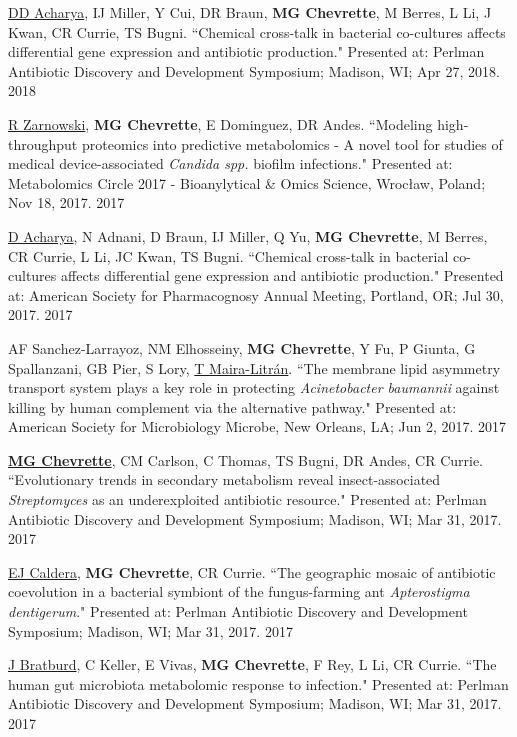 \begin{cvpubs}
\cvpub
{\underline{DD Acharya}, IJ Miller, Y Cui, DR Braun, \textbf{MG Chevrette}, M Berres, L Li, J Kwan, CR Currie, TS Bugni. ``Chemical cross-talk in bacterial co-cultures affects differential gene expression and antibiotic production." Presented at: Perlman Antibiotic Discovery and Development Symposium; Madison, WI; Apr 27, 2018.}
{2018}

\cvpub
{\underline{R Zarnowski}, \textbf{MG Chevrette}, E Dominguez, DR Andes. ``Modeling high-throughput proteomics into predictive metabolomics - A novel tool for studies of medical device-associated \textit{Candida spp.} biofilm infections." Presented at: Metabolomics Circle 2017 - Bioanylytical \& Omics Science, Wrocław, Poland; Nov 18, 2017.}
{2017}

\cvpub
{\underline{D Acharya}, N Adnani, D Braun, IJ Miller, Q Yu, \textbf{MG Chevrette}, M Berres, CR Currie, L Li, JC Kwan, TS Bugni. ``Chemical cross-talk in bacterial co-cultures affects differential gene expression and antibiotic production." Presented at: American Society for Pharmacognosy Annual Meeting, Portland, OR; Jul 30, 2017.}
{2017}

\cvpub
{AF Sanchez-Larrayoz, NM Elhosseiny, \textbf{MG Chevrette}, Y Fu, P Giunta, G Spallanzani, GB Pier, S Lory, \underline{T Maira-Litr\'{a}n}. ``The membrane lipid asymmetry transport system plays a key role in protecting \textit{Acinetobacter baumannii} against killing by human complement via the alternative pathway." Presented at: American Society for Microbiology Microbe, New Orleans, LA; Jun 2, 2017.}
{2017}

\cvpub
{\underline{\textbf{MG Chevrette}}, CM Carlson, C Thomas, TS Bugni, DR Andes, CR Currie. ``Evolutionary trends in secondary metabolism reveal insect-associated \textit{Streptomyces} as an underexploited antibiotic resource." Presented at: Perlman Antibiotic Discovery and Development Symposium; Madison, WI; Mar 31, 2017.}
{2017}

\cvpub
{\underline{EJ Caldera}, \textbf{MG Chevrette}, CR Currie. ``The geographic mosaic of antibiotic coevolution in a bacterial symbiont of the fungus-farming ant \textit{Apterostigma dentigerum}." Presented at: Perlman Antibiotic Discovery and Development Symposium; Madison, WI; Mar 31, 2017.}
{2017}

\cvpub
{\underline{J Bratburd}, C Keller, E Vivas, \textbf{MG Chevrette}, F Rey, L Li, CR Currie. ``The human gut microbiota metabolomic response to infection." Presented at: Perlman Antibiotic Discovery and Development Symposium; Madison, WI; Mar 31, 2017.}
{2017}


\end{cvpubs}
